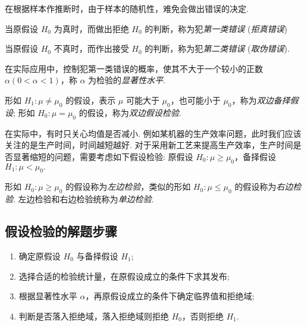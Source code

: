 在根据样本作推断时，由于样本的随机性，难免会做出错误的决定.

\begin{definition}[第一类错误]
    当原假设 $ H_{0} $ 为真时，而做出拒绝 $ H_{0} $ 的判断，称为犯\textit{第一类错误} (\textit{拒真错误})
\end{definition}

\begin{definition}[第二类错误]
    当原假设 $ H_{0} $ 不真时，而作出接受 $ H_{0} $ 的判断，称为犯\textit{第二类错误} (\textit{取伪错误}).
\end{definition}

\begin{definition}[显著性水平]
    在实际应用中，控制犯第一类错误的概率，使其不大于一个较小的正数 $ \alpha(0<\alpha<1)$，称 $ \alpha $ 为检验的\textit{显著性水平}.
\end{definition}

\begin{definition}[双边备择假设与双边假设检验]
    形如 $ H_{1}: \mu \neq \mu_{0} $ 的假设，表示 $ \mu $ 可能大于 $ \mu_{0} $，也可能小于 $ \mu_{0}$，称为\textit{双边备择假设};
    形如 $ H_{0}: \mu=\mu_{0} $ 的假设，称为\textit{双边假设检验}.
\end{definition}

在实际中，有时只关心均值是否减小. 例如某机器的生产效率问题，此时我们应该关注的是生产时间，时间越短越好.
对于采用新工艺来提高生产效率，生产时间是否显著缩短的问题，需要考虑如下假设检验:
原假设 $ H_{0}: \mu \geqslant \mu_{0}$，备择假设 $ H_{1}: \mu<\mu_{0} .$

\begin{definition}[单边检验]
    形如 $ H_{0}: \mu \geqslant \mu_{0} $ 的假设称为\textit{左边检验}，类似的形如 $ H_{0}: \mu \leqslant \mu_{0} $ 的假设称为\textit{右边检验}.
    左边检验和右边检验统称为\textit{单边检验}.
\end{definition}

\subsection{假设检验的解题步骤}

\begin{enumerate}[label=(\arabic{*})]
    \item 确定原假设 $H_0$ 与备择假设 $H_1$;
    \item 选择合适的检验统计量，在原假设成立的条件下求其发布;
    \item 根据显著性水平 $\alpha$，再原假设成立的条件下确定临界值和拒绝域;
    \item 判断是否落入拒绝域，落入拒绝域则拒绝 $H_0$，否则拒绝 $H_1$.
\end{enumerate}